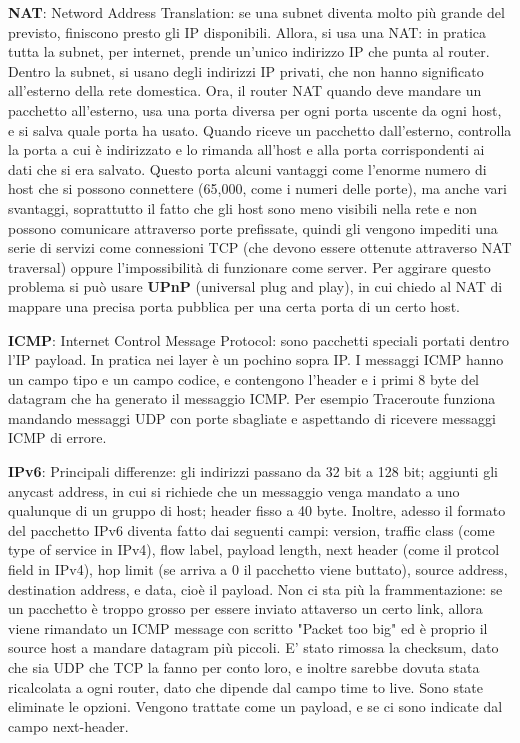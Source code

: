 \documentclass[a4paper,10pt]{article} %
\renewcommand{\b}[1]{%
    {\textbf{#1}}}
\begin{document}
\b{NAT}: Netword Address Translation: se una subnet diventa molto più grande del previsto, finiscono presto gli IP disponibili. Allora, si usa una NAT: in pratica tutta la subnet, per internet, prende un'unico indirizzo IP che punta al router. Dentro la subnet, si usano degli indirizzi IP privati, che non hanno significato all'esterno della rete domestica. Ora, il router NAT quando deve mandare un pacchetto all'esterno, usa una porta diversa per ogni porta uscente da ogni host, e si salva quale porta ha usato. Quando riceve un pacchetto dall'esterno, controlla la porta a cui è indirizzato e lo rimanda all'host e alla porta corrispondenti ai dati che si era salvato. Questo porta alcuni vantaggi come l'enorme numero di host che si possono connettere (65,000, come i numeri delle porte), ma anche vari svantaggi, soprattutto il fatto che gli host sono meno visibili nella rete e non possono comunicare attraverso porte prefissate, quindi gli vengono impediti una serie di servizi come connessioni TCP (che devono essere ottenute attraverso NAT traversal) oppure l'impossibilità di funzionare come server. Per aggirare questo problema si può usare \b{UPnP} (universal plug and play), in cui chiedo al NAT di mappare una precisa porta pubblica per una certa porta di un certo host.

\b{ICMP}: Internet Control Message Protocol: sono pacchetti speciali portati dentro l'IP payload. In pratica nei layer è un pochino sopra IP. I messaggi ICMP hanno un campo tipo e un campo codice, e contengono l'header e i primi 8 byte del datagram che ha generato il messaggio ICMP. Per esempio Traceroute funziona mandando messaggi UDP con porte sbagliate e aspettando di ricevere messaggi ICMP di errore.

\b{IPv6}: Principali differenze: gli indirizzi passano da 32 bit a 128 bit; aggiunti gli anycast address, in cui si richiede che un messaggio venga mandato a uno qualunque di un gruppo di host; header fisso a 40 byte. Inoltre, adesso il formato del pacchetto IPv6 diventa fatto dai seguenti campi: version, traffic class (come type of service in IPv4), flow label, payload length, next header (come il protcol field in IPv4), hop limit (se arriva a 0 il pacchetto viene buttato), source address, destination address, e data, cioè il payload.
Non ci sta più la frammentazione: se un pacchetto è troppo grosso per essere inviato attaverso un certo link, allora viene rimandato un ICMP message con scritto "Packet too big" ed è proprio il source host a mandare datagram più piccoli. E' stato rimossa la checksum, dato che sia UDP che TCP la fanno per conto loro, e inoltre sarebbe dovuta stata ricalcolata a ogni router, dato che dipende dal campo time to live. Sono state eliminate le opzioni. Vengono trattate come un payload, e se ci sono indicate dal campo next-header.
\end{document}
